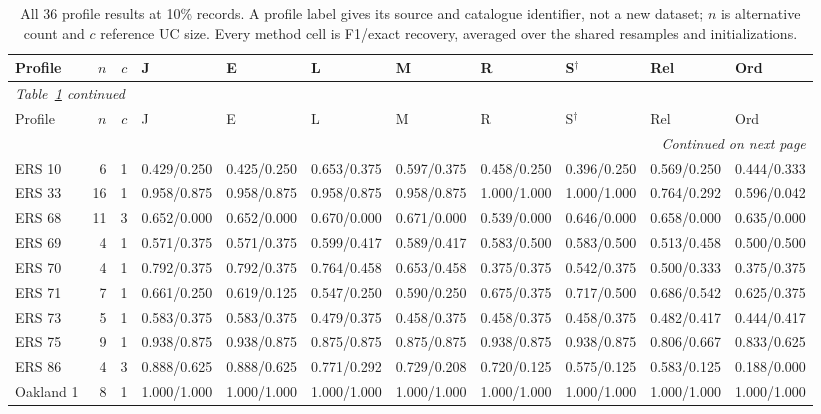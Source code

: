 \begingroup\scriptsize\setlength{\tabcolsep}{2pt}
\begin{longtable}{@{}lrrllllllll@{}}
\caption{All 36 profile results at 10\% records. A profile label gives its source and catalogue identifier, not a new dataset; $n$ is alternative count and $c$ reference UC size. Every method cell is F1/exact recovery, averaged over the shared resamples and initializations.}\label{tab:posterior-native-profiles}\\
\toprule Profile & $n$ & $c$ & J & E & L & M & R & S$^{\dagger}$ & Rel & Ord\\\midrule\endfirsthead
\multicolumn{11}{l}{\textit{Table~\ref{tab:posterior-native-profiles} continued}}\\\toprule
Profile & $n$ & $c$ & J & E & L & M & R & S$^{\dagger}$ & Rel & Ord\\\midrule\endhead
\midrule\multicolumn{11}{r}{\textit{Continued on next page}}\\\endfoot
\bottomrule\endlastfoot
ERS 10 & 6 & 1 & 0.429/0.250 & 0.425/0.250 & 0.653/0.375 & 0.597/0.375 & 0.458/0.250 & 0.396/0.250 & 0.569/0.250 & 0.444/0.333\\
ERS 33 & 16 & 1 & 0.958/0.875 & 0.958/0.875 & 0.958/0.875 & 0.958/0.875 & 1.000/1.000 & 1.000/1.000 & 0.764/0.292 & 0.596/0.042\\
ERS 68 & 11 & 3 & 0.652/0.000 & 0.652/0.000 & 0.670/0.000 & 0.671/0.000 & 0.539/0.000 & 0.646/0.000 & 0.658/0.000 & 0.635/0.000\\
ERS 69 & 4 & 1 & 0.571/0.375 & 0.571/0.375 & 0.599/0.417 & 0.589/0.417 & 0.583/0.500 & 0.583/0.500 & 0.513/0.458 & 0.500/0.500\\
ERS 70 & 4 & 1 & 0.792/0.375 & 0.792/0.375 & 0.764/0.458 & 0.653/0.458 & 0.375/0.375 & 0.542/0.375 & 0.500/0.333 & 0.375/0.375\\
ERS 71 & 7 & 1 & 0.661/0.250 & 0.619/0.125 & 0.547/0.250 & 0.590/0.250 & 0.675/0.375 & 0.717/0.500 & 0.686/0.542 & 0.625/0.375\\
ERS 73 & 5 & 1 & 0.583/0.375 & 0.583/0.375 & 0.479/0.375 & 0.458/0.375 & 0.458/0.375 & 0.458/0.375 & 0.482/0.417 & 0.444/0.417\\
ERS 75 & 9 & 1 & 0.938/0.875 & 0.938/0.875 & 0.875/0.875 & 0.875/0.875 & 0.938/0.875 & 0.938/0.875 & 0.806/0.667 & 0.833/0.625\\
ERS 86 & 4 & 3 & 0.888/0.625 & 0.888/0.625 & 0.771/0.292 & 0.729/0.208 & 0.720/0.125 & 0.575/0.125 & 0.583/0.125 & 0.188/0.000\\
Oakland 1 & 8 & 1 & 1.000/1.000 & 1.000/1.000 & 1.000/1.000 & 1.000/1.000 & 1.000/1.000 & 1.000/1.000 & 1.000/1.000 & 1.000/1.000\\

\end{longtable}
